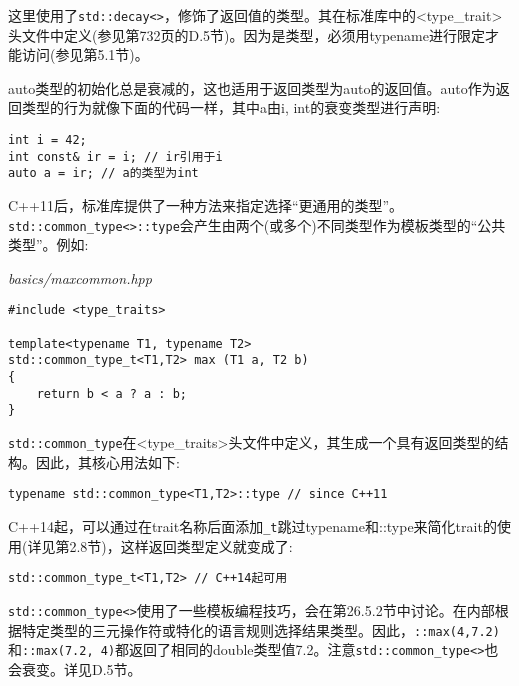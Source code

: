 这里使用了\texttt{std::decay<>}，修饰了返回值的类型。其在标准库中的<type\_trait>头文件中定义(参见第732页的D.5节)。因为是类型，必须用typename进行限定才能访问(参见第5.1节)。

auto类型的初始化总是衰减的，这也适用于返回类型为auto的返回值。auto作为返回类型的行为就像下面的代码一样，其中a由i, int的衰变类型进行声明:

\begin{lstlisting}[style=styleCXX]
int i = 42;
int const& ir = i; // ir引用于i
auto a = ir; // a的类型为int
\end{lstlisting}


C++11后，标准库提供了一种方法来指定选择“更通用的类型”。\texttt{std::common\_type<>::type}会产生由两个(或多个)不同类型作为模板类型的“公共类型”。例如:

\noindent
\textit{basics/maxcommon.hpp}
\begin{lstlisting}[style=styleCXX]
#include <type_traits>

template<typename T1, typename T2>
std::common_type_t<T1,T2> max (T1 a, T2 b)
{
	return b < a ? a : b;
}
\end{lstlisting}

\texttt{std::common\_type}在<type\_traits>头文件中定义，其生成一个具有返回类型的结构。因此，其核心用法如下:

\begin{lstlisting}[style=styleCXX]
typename std::common_type<T1,T2>::type // since C++11
\end{lstlisting}

C++14起，可以通过在trait名称后面添加\texttt{\_t}跳过typename和::type来简化trait的使用(详见第2.8节)，这样返回类型定义就变成了:

\begin{lstlisting}[style=styleCXX]
std::common_type_t<T1,T2> // C++14起可用
\end{lstlisting}

\texttt{std::common\_type<>}使用了一些模板编程技巧，会在第26.5.2节中讨论。在内部根据特定类型的三元操作符或特化的语言规则选择结果类型。因此，\texttt{::max(4,7.2)}和\texttt{::max(7.2, 4)}都返回了相同的double类型值7.2。注意\texttt{std::common\_type<>}也会衰变。详见D.5节。




